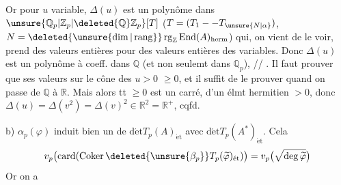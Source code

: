 Or pour $u$ variable, $\Delta(u)$ est un polynôme
dans $\unsure{\mathbb Q_p|\mathbb Z_p|\deleted{\mathbb Q}\mathbb Z_p}[T]$ ($T=(T_1\mathbin{-}\mathbin{-}T_{\unsure{N|\alpha}})$, $N=\deleted{\unsure{\dim|\operatorname{rang}}}\operatorname{rg}_{\mathbb Z}\operatorname{End}(A)_{\mathrm{herm}}$)
qui, on vient de le voir, prend des valeurs entières
pour des valeurs entières des variables. Donc
$\Delta(u)$ est un polynôme à coeff.  dans $\mathbb Q$
(et non seulemt dans $\mathbb Q_p$), // . Il faut prouver que
ses valeurs sur le cône des $u>0$
 $\geq0$, et  il suffit de le prouver
quand on passe de $\mathbb Q$ à $\mathbb R$. Mais alors
tt  $\geq0$ est un carré, d'un élmt
hermitien  $>0$, donc $\Delta(u)=\Delta(v^2)=\Delta(v)^2\in\mathbb R^{2}=\mathbb R^+$,
cqfd.

b) $\alpha_p(\varphi)$ induit bien un  de $\operatorname{d\acute et}T_p(A)_{\mathrm{\acute et}}$ avec
$\operatorname{d\acute et}T_p(A^*)_{\mathrm{\acute et}}$. Cela 
\[
v_p\bigl(\operatorname{card}(\operatorname{Coker}\deleted{\unsure{\beta_p}}T_p(\widetilde\varphi)_{\mathrm{\acute et}})\bigr)
=v_p\bigl(\sqrt{\deg\widetilde\varphi}\bigr)
\]
Or on a 
